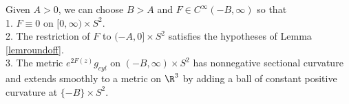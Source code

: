\begin{lemma}
  \label{lem:kl-surgery-pinching-condition-positivity-ricci-flow-surgery}
 \label{capoff}
Given $A > 0$, we can choose $B > A$ and
$F  \in  C^\infty(-B,\infty)$ so that \\
1. $F\equiv 0$ on $[0,\infty) \times S^2$. \\
2. The restriction of $F$ to $(-A,0] \times S^2$
satisfies the hypotheses of Lemma \ref{lemroundoff}.\\
3. The metric $e^{2F(z)} g_{cyl}$ on $(-B,\infty) \times S^2$
has nonnegative sectional curvature and extends
smoothly to a metric on $\R^3$
by adding a ball of constant positive curvature at
$\{-B\} \times S^2$.
\end{lemma}
